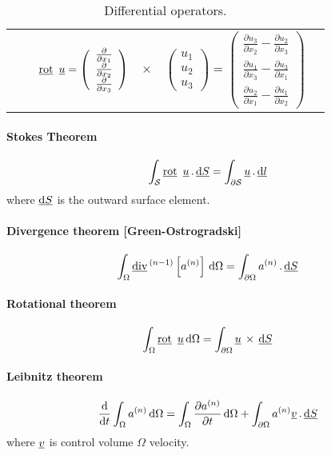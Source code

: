 \begin{table}[!htb]
\begin{tabular}{l | c | l | l @{}l@{\,} l  }
&  & $\underline{\text{rot}}\  \, \underline{u}  =
 \left( \begin{array}{c}
\frac{\partial }{\partial x_1}\\
\frac{\partial }{\partial x_2}\\
\frac{\partial }{\partial x_3}
\end{array} \right)
$&$ \times $&$
\left( \begin{array}{c}
u_1\\
u_2 \\
u_3
\end{array} \right)
 =
\left( \begin{array}{c}
\frac{\partial u_3}{\partial x_2} - \frac{\partial u_2}{\partial x_3}\\
\frac{\partial u_1}{\partial x_3} - \frac{\partial u_3}{\partial x_1} \\
\frac{\partial u_2}{\partial x_1} -\frac{\partial u_1}{\partial x_2}
\end{array} \right)
$
\end{tabular}
\caption{Differential operators.}
\end{table}
%
%

\paragraph{Stokes Theorem}
%
\begin{equation*}
\int_{ \mathcal{S}} \underline{\text{rot}}\  \, \underline{u} \, . \, \underline{ \mathrm{d}S} = \int_{\partial \mathcal{S} } \underline{u} \, . \, \underline{\mathrm{d}l }
\end{equation*}
where $ \underline{ \mathrm{d}S }$ is the outward surface element.

\paragraph{Divergence theorem [Green-Ostrogradski]}
%
\begin{equation*}
\int_{ \Omega } \underline{\text{div}}\,^{(n-1)}  \left[ a^{(n)} \right] \, \mathrm{d}\Omega= \int_{\partial \Omega } a^{(n)} \, . \, \underline{ \mathrm{d}S }
\end{equation*}
\paragraph{Rotational theorem}
%
\begin{equation*}
\int_{ \Omega } \underline{\text{rot}}\  \, \underline{u} \, \mathrm{d}\Omega= \int_{\partial \Omega } \underline{u} \, \times \, \underline{ \mathrm{d}S }
\end{equation*}

\paragraph{Leibnitz theorem}
%
\begin{equation*}
\dfrac{ \mathrm{d} }{ \mathrm{d}t }\int_{ \Omega } a^{(n)} \, \mathrm{d}\Omega =
\int_{ \Omega } \dfrac{\partial a^{(n)} }{ \partial t} \, \mathrm{d}\Omega
+ \int_{\partial \Omega } a^{(n)} \underline{v} \, . \, \underline{ \mathrm{d}S }
\end{equation*}
where $\underline{v}$ is control volume $ \Omega$ velocity.
